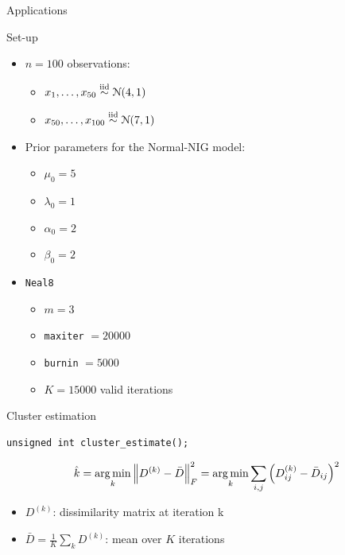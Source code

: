 \begin{frame}[c]
	\begin{center}
		\huge \color{blue} Applications
	\end{center}
\end{frame}

\begin{frame}[fragile]{Set-up}
\begin{itemize}
\item $n=100$ observations:
	\begin{itemize}
	\item $x_1,\dots, x_{50} \stackrel{\text{iid}}{\sim} \mathcal N(4,1)$
	\item $x_{50}, \dots, x_{100} \stackrel{\text{iid}}{\sim} \mathcal N(7,1)$
	\end{itemize}
\item Prior parameters for the Normal-NIG model:
	\begin{itemize}
	\item $\mu_0 = 5$ 
	\item $\lambda_0 = 1$
	\item $\alpha_0 = 2$
	\item $\beta_0 = 2$
	\end{itemize}

\item \verb|Neal8|
	\begin{itemize}
	\item $m=3$ 
	\item \verb|maxiter| $=20000$
	\item \verb|burnin| $=5000$
	\item $K=15000$ valid iterations
	\end{itemize}
\end{itemize}
\end{frame}

\begin{frame}[fragile]{Cluster estimation}


\begin{verbatim}
unsigned int cluster_estimate();
\end{verbatim}

$$ \hat{k} = \operatorname*{arg\,min}_k \left \lVert D^{(k)} - \bar D \right\rVert_F^2= \operatorname*{arg\,min}_k \sum_{i,j} \left( D^{(k)}_{ij} - \bar{D}_{ij}  \right)^2$$


\begin{itemize}

\item $D^{(k)}$: dissimilarity matrix  at iteration k \\

\item $\bar D= \frac{1}{K} \sum_k D^{(k)} $: mean over $K$ iterations
\end{itemize}

\end{frame}

